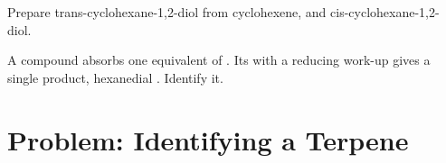 \begin{exercise}[$\star\star\star$]\label{exo:b2:alkene-redox:11}
Prepare trans-cyclohexane-1,2-diol from cyclohexene, and cis-cyclohexane-1,2-diol.
\end{exercise}

\begin{exercise}[$\star\star\star$]\label{exo:b2:alkene-redox:12}
A compound  absorbs one equivalent of . Its  with a reducing
work-up gives a single product, hexanedial . Identify it.
\end{exercise}

\section{Problem: Identifying a Terpene}

